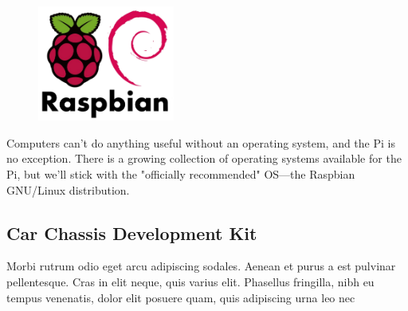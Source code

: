 \begin{figure}
\vspace{-25pt}
  \begin{center}
    \includegraphics[width=0.4\textwidth]{./Pictures/raspbian.png}
  \end{center}
\end{figure}
\hfill \break
Computers can't do anything useful without an operating system, and the Pi is
no exception. There is a growing collection of operating systems available for
the Pi, but we'll stick with the "officially recommended" OS—the Raspbian
GNU/Linux distribution.
\clearpage

\subsection{Car Chassis Development Kit}

Morbi rutrum odio eget arcu adipiscing sodales. Aenean et purus a est pulvinar pellentesque. Cras in elit neque, quis varius elit. Phasellus fringilla, nibh eu tempus venenatis, dolor elit posuere quam, quis adipiscing urna leo nec 

